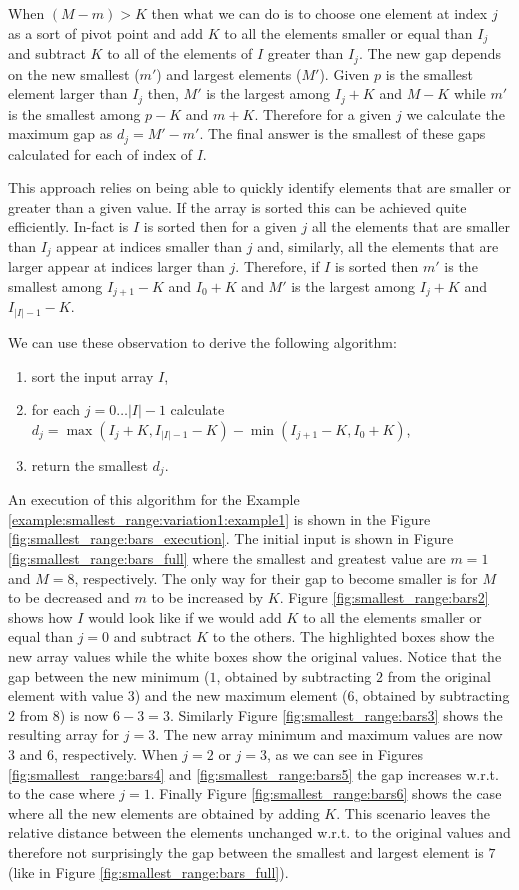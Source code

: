 When $(M-m) > K$ then what we can do is to choose one element at index $j$ as a sort of pivot point
and add $K$ to all the elements smaller or equal than $I_j$ and subtract $K$ to all of the elements
of $I$ greater than $I_j$. The new gap depends on the new smallest ($m'$) and largest elements
($M'$). Given $p$ is the smallest element larger than $I_j$ then, $M'$ is the largest among $I_j+K$
and $M-K$ while $m'$ is the smallest among $p - K$ and $m+K$. Therefore for a given $j$ we calculate
the maximum gap as $d_j = M'-m'$. The final answer is the smallest of these gaps calculated for each
of index of $I$.

This approach relies on being able to quickly identify elements that are smaller or greater than a
given value. If the array is sorted this can be achieved quite efficiently. In-fact is $I$ is sorted
then for a given $j$ all the elements that are smaller than $I_j$ appear at indices smaller than $j$
and, similarly, all the elements that are larger appear at indices larger than $j$. Therefore, if
$I$ is sorted then $m'$ is the smallest among $I_{j+1}-K$ and $I_0 +K$ and $M'$ is the largest among
$I_j+K$ and $I_{|I|-1}-K$.


We can use these observation to derive the following algorithm:
\begin{enumerate}
	\item sort the input array $I$,
	\item for each $j = 0 \ldots |I|-1$ calculate $d_j = \max{(I_j+K,I_{|I|-1}-K)} -
	\min{(I_{j+1}-K, I_0 +K)}$,
	\item return the smallest $d_j$.
\end{enumerate}
An execution of this algorithm for the Example \ref{example:smallest_range:variation1:example1} is
shown in the Figure \ref{fig:smallest_range:bars_execution}. The initial input is shown in Figure
\ref{fig:smallest_range:bars_full} where the smallest and greatest value are $m=1$ and $M=8$,
respectively. The only way for their gap to become smaller is for $M$ to be decreased and $m$ to be
increased by $K$. Figure \ref{fig:smallest_range:bars2} shows how $I$ would look like if we would
add $K$ to all the elements smaller or equal than $j=0$ and subtract $K$ to the others. The
highlighted boxes show the new array values while the white boxes show the original values. Notice
that the gap between the new minimum ($1$, obtained by subtracting $2$ from the original element
with value $3$) and the new maximum element ($6$, obtained by subtracting $2$ from $8$) is now
$6-3=3$. Similarly Figure \ref{fig:smallest_range:bars3} shows the resulting array for $j=3$. The
new array minimum and maximum values are now $3$ and $6$, respectively. When $j=2$ or $j=3$, as we
can see in Figures \ref{fig:smallest_range:bars4} and \ref{fig:smallest_range:bars5} the gap
increases w.r.t. to the case where $j=1$. Finally Figure \ref{fig:smallest_range:bars6} shows the
case where all the new elements are obtained by adding $K$. This scenario leaves the relative
distance between the elements unchanged w.r.t. to the original values and therefore not surprisingly
the gap between the smallest and largest element is $7$ (like in Figure
\ref{fig:smallest_range:bars_full}).


